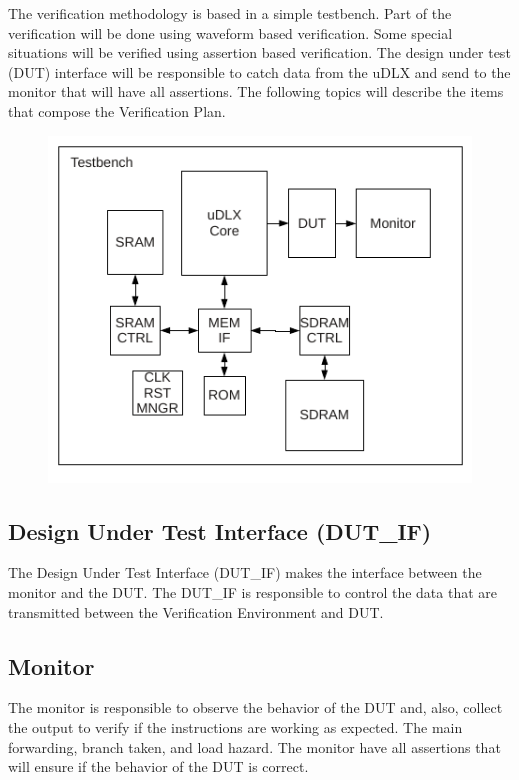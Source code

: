 \documentclass{article}
\begin{document}
	The verification methodology is based in a simple testbench. Part of the verification will be done using waveform based verification. Some special situations will be verified using assertion based verification. The design under test (DUT) interface will be responsible to catch data from the uDLX and send to the monitor that will have all assertions. The following topics will describe the items that compose the Verification Plan.
	
		
	\begin{figure}[H]
    	\centering
    	\includegraphics[width=\linewidth]{pictures/verification_environment.png}
  	\end{figure} 
	
	\subsection{Design Under Test Interface (DUT\_IF)}
	
	The Design Under Test Interface (DUT\_IF) makes the interface between the monitor and the DUT. The DUT\_IF is responsible to control the data that are transmitted between the Verification Environment and DUT.
	
	\subsection{Monitor}
	
	The monitor is responsible to observe the behavior of the DUT and, also, collect the output to verify if the instructions are working as expected. The main forwarding, branch taken, and load hazard.
The monitor have all assertions that will ensure if the behavior of the DUT is correct.
	
\end{document}

